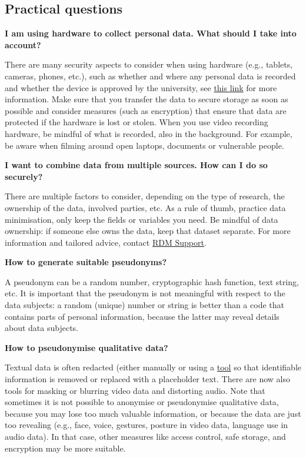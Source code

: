 \documentclass[
]{book}
\begin{document}
\hypertarget{practical-questions}{%
\subsection{Practical questions}\label{practical-questions}}

\textbf{I am using hardware to collect personal data. What should I take into account?}

There are many security aspects to consider when using hardware (e.g., tablets, cameras, phones, etc.), such as whether and where any personal data is recorded and whether the device is approved by the university, see \href{https://students.uu.nl/en/practical-information/it-facilities/information-security-at-the-uu}{this link} for more information. Make sure that you transfer the data to secure storage as soon as possible and consider measures (such as encryption) that ensure that data are protected if the hardware is lost or stolen. When you use video recording hardware, be mindful of what is recorded, also in the background. For example, be aware when filming around open laptops, documents or vulnerable people.

\textbf{I want to combine data from multiple sources. How can I do so securely?}

There are multiple factors to consider, depending on the type of research, the ownership of the data, involved parties, etc. As a rule of thumb, practice data minimisation, only keep the fields or variables you need. Be mindful of data ownership: if someone else owns the data, keep that dataset separate. For more information and tailored advice, contact \href{https://www.uu.nl/en/research/research-data-management/contact-us}{RDM Support}.

\textbf{How to generate suitable pseudonyms?}

A pseudonym can be a random number, cryptographic hash function, text string, etc. It is important that the pseudonym is not meaningful with respect to the data subjects: a random (unique) number or string is better than a code that contains parts of personal information, because the latter may reveal details about data subjects.

\textbf{How to pseudonymise qualitative data?}

Textual data is often redacted (either manually or using a \href{https://github.com/UtrechtUniversity/privacy-engineering-tools/tree/main/deidentification}{tool} so that identifiable information is removed or replaced with a placeholder text. There are now also tools for masking or blurring video data and distorting audio. Note that sometimes it is not possible to anonymise or pseudonymise qualitative data, because you may lose too much valuable information, or because the data are just too revealing (e.g., face, voice, gestures, posture in video data, language use in audio data). In that case, other measures like access control, safe storage, and encryption may be more suitable.
\end{document}
